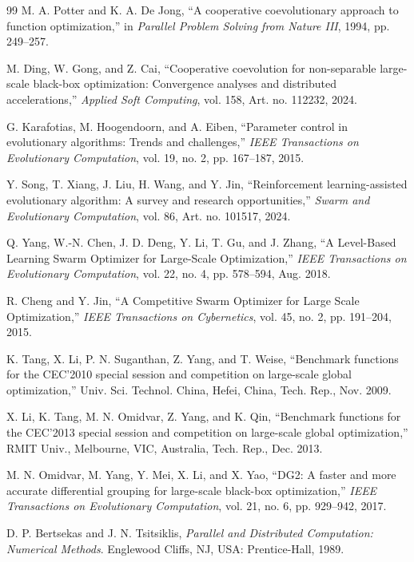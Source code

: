 \documentclass[conference]{IEEEtran}
\begin{document}
\begin{thebibliography}{99}
 M. A. Potter and K. A. De Jong, ``A cooperative coevolutionary approach to function optimization,'' in \emph{Parallel Problem Solving from Nature III}, 1994, pp. 249--257.

 M. Ding, W. Gong, and Z. Cai, ``Cooperative coevolution for non-separable large-scale black-box optimization: Convergence analyses and distributed accelerations,'' \emph{Applied Soft Computing}, vol. 158, Art. no. 112232, 2024.

 G. Karafotias, M. Hoogendoorn, and A. Eiben, ``Parameter control in evolutionary algorithms: Trends and challenges,'' \emph{IEEE Transactions on Evolutionary Computation}, vol. 19, no. 2, pp. 167--187, 2015.

 Y. Song, T. Xiang, J. Liu, H. Wang, and Y. Jin, ``Reinforcement learning-assisted evolutionary algorithm: A survey and research opportunities,'' \emph{Swarm and Evolutionary Computation}, vol. 86, Art. no. 101517, 2024.

 Q. Yang, W.-N. Chen, J. D. Deng, Y. Li, T. Gu, and J. Zhang, ``A Level-Based Learning Swarm Optimizer for Large-Scale Optimization,'' \emph{IEEE Transactions on Evolutionary Computation}, vol. 22, no. 4, pp. 578--594, Aug. 2018.

 R. Cheng and Y. Jin, ``A Competitive Swarm Optimizer for Large Scale Optimization,'' \emph{IEEE Transactions on Cybernetics}, vol. 45, no. 2, pp. 191--204, 2015.

 K. Tang, X. Li, P. N. Suganthan, Z. Yang, and T. Weise, ``Benchmark functions for the CEC'2010 special session and competition on large-scale global optimization,'' Univ. Sci. Technol. China, Hefei, China, Tech. Rep., Nov. 2009.

 X. Li, K. Tang, M. N. Omidvar, Z. Yang, and K. Qin, ``Benchmark functions for the CEC'2013 special session and competition on large-scale global optimization,'' RMIT Univ., Melbourne, VIC, Australia, Tech. Rep., Dec. 2013.

 M. N. Omidvar, M. Yang, Y. Mei, X. Li, and X. Yao, ``DG2: A faster and more accurate differential grouping for large-scale black-box optimization,'' \emph{IEEE Transactions on Evolutionary Computation}, vol. 21, no. 6, pp. 929--942, 2017.

 D. P. Bertsekas and J. N. Tsitsiklis, \emph{Parallel and Distributed Computation: Numerical Methods}. Englewood Cliffs, NJ, USA: Prentice-Hall, 1989.


\end{thebibliography}
\end{document}
